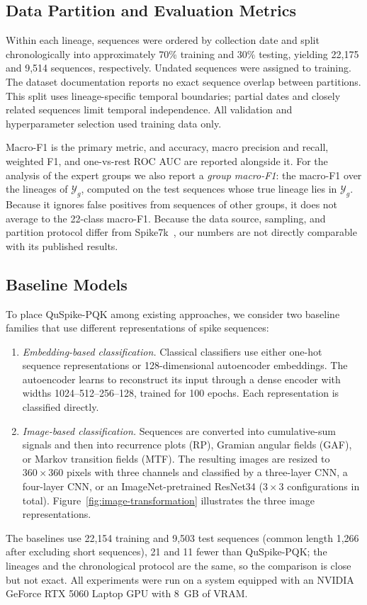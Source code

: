 \documentclass[conference]{IEEEtran}
\begin{document}
\subsection{Data Partition and Evaluation Metrics}
\label{sec:metrics}

Within each lineage, sequences were ordered by collection date and split chronologically into approximately 70\% training and 30\% testing, yielding 22,175 and 9,514 sequences, respectively. Undated sequences were assigned to training. The dataset documentation reports no exact sequence overlap between partitions. This split uses lineage-specific temporal boundaries; partial dates and closely related sequences limit temporal independence. All validation and hyperparameter selection used training data only.

Macro-F1 is the primary metric, and accuracy, macro precision and recall, weighted F1, and one-vs-rest ROC AUC are reported alongside it. For the analysis of the expert groups we also report a \emph{group macro-F1}: the macro-F1 over the lineages of $\mathcal{Y}_g$, computed on the test sequences whose true lineage lies in $\mathcal{Y}_g$. Because it ignores false positives from sequences of other groups, it does not average to the 22-class macro-F1. Because the data source, sampling, and partition protocol differ from Spike7k~\cite{murad2024snn}, our numbers are not directly comparable with its published results.

\subsection{Baseline Models}
\label{sec:baselines}

To place QuSpike-PQK among existing approaches, we consider two baseline families that use different representations of spike sequences:
\begin{enumerate}
    \item \textit{Embedding-based classification.} Classical classifiers use either one-hot sequence representations or 128-dimensional autoencoder embeddings. The autoencoder learns to reconstruct its input through a dense encoder with widths 1024--512--256--128, trained for 100 epochs. Each representation is classified directly.
    \item \textit{Image-based classification.} Sequences are converted into cumulative-sum signals and then into recurrence plots (RP), Gramian angular fields (GAF), or Markov transition fields (MTF). The resulting images are resized to $360\times360$ pixels with three channels and classified by a three-layer CNN, a four-layer CNN, or an ImageNet-pretrained ResNet34 ($3\times3$ configurations in total). Figure~\ref{fig:image-transformation} illustrates the three image representations.
\end{enumerate}
The baselines use 22,154 training and 9,503 test sequences (common length 1,266 after excluding short sequences), 21 and 11 fewer than QuSpike-PQK; the lineages and the chronological protocol are the same, so the comparison is close but not exact. All experiments were run on a system equipped with an NVIDIA GeForce RTX 5060 Laptop GPU with 8~GB of VRAM.
\end{document}
